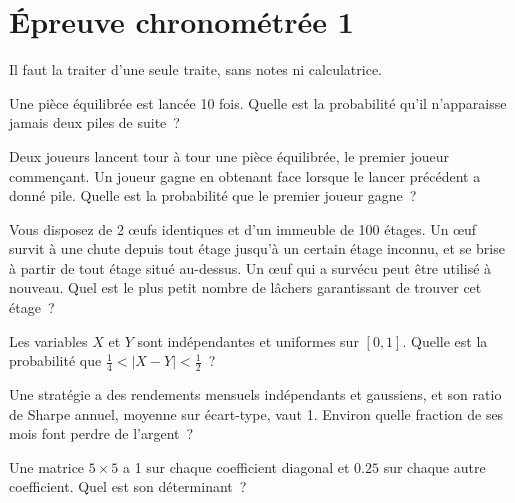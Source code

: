 \chapter{Épreuve chronométrée 1}\label{ch:iv1:timed-test-1}

\begin{ivtrains}
Il faut la traiter d'une seule traite, sans notes ni calculatrice.
\end{ivtrains}


\begin{question}\label{iq:iv1:timed-test-1:1}
Une pièce équilibrée est lancée 10 fois. Quelle est la probabilité qu'il n'apparaisse jamais deux piles de suite~?
\end{question}

\begin{question}\label{iq:iv1:timed-test-1:2}
Deux joueurs lancent tour à tour une pièce équilibrée, le premier joueur commençant. Un joueur gagne en obtenant face lorsque le lancer précédent a donné pile. Quelle est la probabilité que le premier joueur gagne~?
\end{question}

\begin{question}\label{iq:iv1:timed-test-1:3}
Vous disposez de 2 œufs identiques et d'un immeuble de 100 étages. Un œuf survit à une chute depuis tout étage jusqu'à un certain étage inconnu, et se brise à partir de tout étage situé au-dessus. Un œuf qui a survécu peut être utilisé à nouveau. Quel est le plus petit nombre de lâchers garantissant de trouver cet étage~?
\end{question}

\begin{question}\label{iq:iv1:timed-test-1:4}
Les variables $X$ et $Y$ sont indépendantes et uniformes sur $[0, 1]$. Quelle est la probabilité que $\tfrac14 < |X - Y| < \tfrac12$~?
\end{question}

\begin{question}\label{iq:iv1:timed-test-1:5}
Une stratégie a des rendements mensuels indépendants et gaussiens, et son ratio de Sharpe annuel, moyenne sur écart-type, vaut 1. Environ quelle fraction de ses mois font perdre de l'argent~?
\end{question}

\begin{question}\label{iq:iv1:timed-test-1:6}
Une matrice $5 \times 5$ a 1 sur chaque coefficient diagonal et $0.25$ sur chaque autre coefficient. Quel est son déterminant~?
\end{question}


